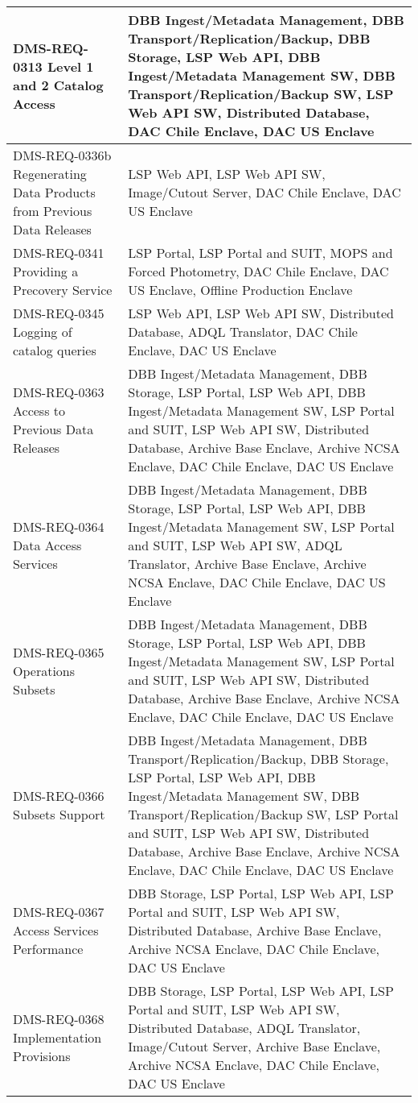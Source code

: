 \begin{xtabular}{p{0.4\textwidth}p{0.55\textwidth}}
DMS-REQ-0313 Level 1 and 2 Catalog Access & DBB Ingest/Metadata Management, DBB Transport/Replication/Backup, DBB Storage, LSP Web API, DBB Ingest/Metadata Management SW, DBB Transport/Replication/Backup SW, LSP Web API SW, Distributed Database, DAC Chile Enclave, DAC US Enclave \\ \hline
DMS-REQ-0336b Regenerating Data Products from Previous Data Releases & LSP Web API, LSP Web API SW, Image/Cutout Server, DAC Chile Enclave, DAC US Enclave \\ \hline
DMS-REQ-0341 Providing a Precovery Service & LSP Portal, LSP Portal and SUIT, MOPS and Forced Photometry, DAC Chile Enclave, DAC US Enclave, Offline Production Enclave \\ \hline
DMS-REQ-0345 Logging of catalog queries & LSP Web API, LSP Web API SW, Distributed Database, ADQL Translator, DAC Chile Enclave, DAC US Enclave \\ \hline
DMS-REQ-0363 Access to Previous Data Releases & DBB Ingest/Metadata Management, DBB Storage, LSP Portal, LSP Web API, DBB Ingest/Metadata Management SW, LSP Portal and SUIT, LSP Web API SW, Distributed Database, Archive Base Enclave, Archive NCSA Enclave, DAC Chile Enclave, DAC US Enclave \\ \hline
DMS-REQ-0364 Data Access Services & DBB Ingest/Metadata Management, DBB Storage, LSP Portal, LSP Web API, DBB Ingest/Metadata Management SW, LSP Portal and SUIT, LSP Web API SW, ADQL Translator, Archive Base Enclave, Archive NCSA Enclave, DAC Chile Enclave, DAC US Enclave \\ \hline
DMS-REQ-0365 Operations Subsets & DBB Ingest/Metadata Management, DBB Storage, LSP Portal, LSP Web API, DBB Ingest/Metadata Management SW, LSP Portal and SUIT, LSP Web API SW, Distributed Database, Archive Base Enclave, Archive NCSA Enclave, DAC Chile Enclave, DAC US Enclave \\ \hline
DMS-REQ-0366 Subsets Support & DBB Ingest/Metadata Management, DBB Transport/Replication/Backup, DBB Storage, LSP Portal, LSP Web API, DBB Ingest/Metadata Management SW, DBB Transport/Replication/Backup SW, LSP Portal and SUIT, LSP Web API SW, Distributed Database, Archive Base Enclave, Archive NCSA Enclave, DAC Chile Enclave, DAC US Enclave \\ \hline
DMS-REQ-0367 Access Services Performance & DBB Storage, LSP Portal, LSP Web API, LSP Portal and SUIT, LSP Web API SW, Distributed Database, Archive Base Enclave, Archive NCSA Enclave, DAC Chile Enclave, DAC US Enclave \\ \hline
DMS-REQ-0368 Implementation Provisions & DBB Storage, LSP Portal, LSP Web API, LSP Portal and SUIT, LSP Web API SW, Distributed Database, ADQL Translator, Image/Cutout Server, Archive Base Enclave, Archive NCSA Enclave, DAC Chile Enclave, DAC US Enclave \\ \hline

\end{xtabular}
